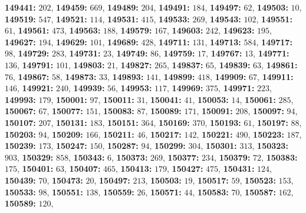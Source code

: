\textsf{\bfseries 149441:} $202$, \textsf{\bfseries 149459:} $669$, \textsf{\bfseries 149489:} $204$, \textsf{\bfseries 149491:} $184$, \textsf{\bfseries 149497:} $62$, \textsf{\bfseries 149503:} $10$, \textsf{\bfseries 149519:} $547$, \textsf{\bfseries 149521:} $114$, \textsf{\bfseries 149531:} $415$, \textsf{\bfseries 149533:} $269$, \textsf{\bfseries 149543:} $102$, \textsf{\bfseries 149551:} $61$, \textsf{\bfseries 149561:} $473$, \textsf{\bfseries 149563:} $188$, \textsf{\bfseries 149579:} $167$, \textsf{\bfseries 149603:} $242$, \textsf{\bfseries 149623:} $195$, \textsf{\bfseries 149627:} $194$, \textsf{\bfseries 149629:} $101$, \textsf{\bfseries 149689:} $428$, \textsf{\bfseries 149711:} $131$, \textsf{\bfseries 149713:} $584$, \textsf{\bfseries 149717:} $98$, \textsf{\bfseries 149729:} $283$, \textsf{\bfseries 149731:} $23$, \textsf{\bfseries 149749:} $86$, \textsf{\bfseries 149759:} $17$, \textsf{\bfseries 149767:} $13$, \textsf{\bfseries 149771:} $136$, \textsf{\bfseries 149791:} $101$, \textsf{\bfseries 149803:} $21$, \textsf{\bfseries 149827:} $265$, \textsf{\bfseries 149837:} $65$, \textsf{\bfseries 149839:} $63$, \textsf{\bfseries 149861:} $76$, \textsf{\bfseries 149867:} $58$, \textsf{\bfseries 149873:} $33$, \textsf{\bfseries 149893:} $141$, \textsf{\bfseries 149899:} $418$, \textsf{\bfseries 149909:} $67$, \textsf{\bfseries 149911:} $146$, \textsf{\bfseries 149921:} $240$, \textsf{\bfseries 149939:} $56$, \textsf{\bfseries 149953:} $117$, \textsf{\bfseries 149969:} $375$, \textsf{\bfseries 149971:} $223$, \textsf{\bfseries 149993:} $179$, \textsf{\bfseries 150001:} $97$, \textsf{\bfseries 150011:} $31$, \textsf{\bfseries 150041:} $41$, \textsf{\bfseries 150053:} $14$, \textsf{\bfseries 150061:} $285$, \textsf{\bfseries 150067:} $67$, \textsf{\bfseries 150077:} $151$, \textsf{\bfseries 150083:} $87$, \textsf{\bfseries 150089:} $171$, \textsf{\bfseries 150091:} $208$, \textsf{\bfseries 150097:} $94$, \textsf{\bfseries 150107:} $207$, \textsf{\bfseries 150131:} $183$, \textsf{\bfseries 150151:} $364$, \textsf{\bfseries 150169:} $370$, \textsf{\bfseries 150193:} $61$, \textsf{\bfseries 150197:} $88$, \textsf{\bfseries 150203:} $94$, \textsf{\bfseries 150209:} $166$, \textsf{\bfseries 150211:} $46$, \textsf{\bfseries 150217:} $142$, \textsf{\bfseries 150221:} $490$, \textsf{\bfseries 150223:} $187$, \textsf{\bfseries 150239:} $173$, \textsf{\bfseries 150247:} $150$, \textsf{\bfseries 150287:} $94$, \textsf{\bfseries 150299:} $304$, \textsf{\bfseries 150301:} $313$, \textsf{\bfseries 150323:} $903$, \textsf{\bfseries 150329:} $858$, \textsf{\bfseries 150343:} $6$, \textsf{\bfseries 150373:} $269$, \textsf{\bfseries 150377:} $234$, \textsf{\bfseries 150379:} $72$, \textsf{\bfseries 150383:} $175$, \textsf{\bfseries 150401:} $63$, \textsf{\bfseries 150407:} $465$, \textsf{\bfseries 150413:} $179$, \textsf{\bfseries 150427:} $475$, \textsf{\bfseries 150431:} $124$, \textsf{\bfseries 150439:} $70$, \textsf{\bfseries 150473:} $20$, \textsf{\bfseries 150497:} $213$, \textsf{\bfseries 150503:} $19$, \textsf{\bfseries 150517:} $59$, \textsf{\bfseries 150523:} $153$, \textsf{\bfseries 150533:} $98$, \textsf{\bfseries 150551:} $138$, \textsf{\bfseries 150559:} $26$, \textsf{\bfseries 150571:} $44$, \textsf{\bfseries 150583:} $70$, \textsf{\bfseries 150587:} $162$, \textsf{\bfseries 150589:} $120$, 
